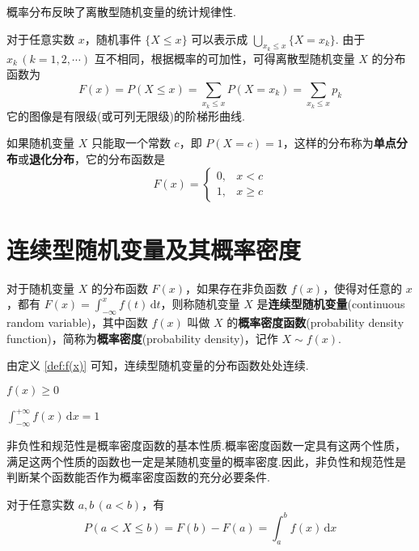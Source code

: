 概率分布反映了离散型随机变量的统计规律性.

对于任意实数 $x$，随机事件 $\{X \leqslant x\}$ 可以表示成 $\displaystyle\bigcup_{x_k \leqslant x} \{X=x_k\}$. 由于 $x_k\, (k=1,2,\cdots)$ 互不相同，根据概率的可加性，可得离散型随机变量 $X$ 的分布函数为
$$
F(x) = P(X \leqslant x) = \sum_{x_k \leqslant x} P(X=x_k) = \sum_{x_k \leqslant x} p_k
$$
它的图像是有限级(或可列无限级)的阶梯形曲线.

如果随机变量 $X$ 只能取一个常数 $c$，即 $P(X=c) = 1$，这样的分布称为\textbf{单点分布}或\textbf{退化分布}，它的分布函数是
$$
F(x) = \begin{cases}
    0, & x < c \\
    1, & x \geqslant c
\end{cases}
$$

\section{连续型随机变量及其概率密度}

\begin{definition}[][][def:f(x)]
    \indent 对于随机变量 $X$ 的分布函数 $F(x)$，如果存在非负函数 $f(x)$，使得对任意的 $x$，都有 $F(x)=\displaystyle\int_{-\infty}^x f(t)\,\text{d}t$，则称随机变量 $X$ 是\textbf{连续型随机变量}(continuous random variable)，其中函数 $f(x)$ 叫做 $X$ 的\textbf{概率密度函数}(probability density function)，简称为\textbf{概率密度}(probability density)，记作 $X \sim f(x)$.
\end{definition}

由定义 \ref{def:f(x)} 可知，连续型随机变量的分布函数处处连续.

\vspace{0.2em}

\begin{property}[][非负性][prop:f(x)>=0]
    \indent $f(x) \geqslant 0$
\end{property}

\begin{property}[][规范性][prop:f(x):integral=1]
    \indent $\displaystyle\int_{-\infty}^{+\infty} f(x)\,\text{d}x = 1$
\end{property}

非负性和规范性是概率密度函数的基本性质.概率密度函数一定具有这两个性质，满足这两个性质的函数也一定是某随机变量的概率密度.因此，非负性和规范性是判断某个函数能否作为概率密度函数的充分必要条件.

\begin{property}
    \indent 对于任意实数 $a,b\,(a<b)$，有
    $$
    P(a < X \leqslant b) = F(b)-F(a) = \int_a^b f(x)\,\text{d}x
    $$
\end{property}

